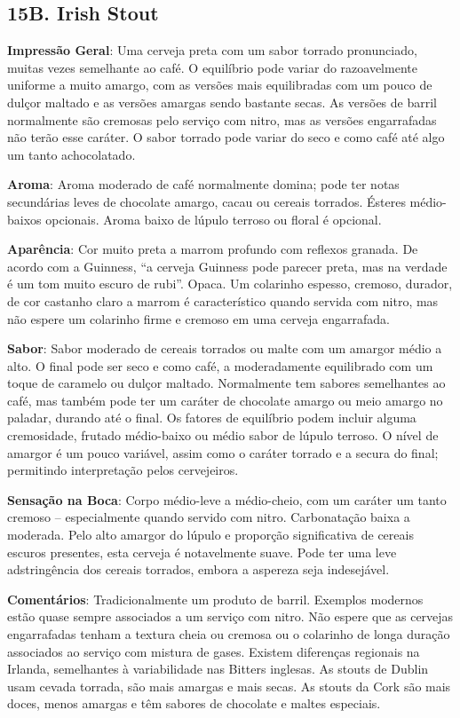 \subsection*{15B. Irish Stout}
\textbf{Impressão Geral}: Uma cerveja preta com um sabor torrado pronunciado, muitas vezes semelhante ao café. O equilíbrio pode variar do razoavelmente uniforme a muito amargo, com as versões mais equilibradas com um pouco de dulçor maltado e as versões amargas sendo bastante secas. As versões de barril normalmente são cremosas pelo serviço com nitro, mas as versões engarrafadas não terão esse caráter. O sabor torrado pode variar do seco e como café até algo um tanto achocolatado.

\textbf{Aroma}: Aroma moderado de café normalmente domina; pode ter notas secundárias leves de chocolate amargo, cacau ou cereais torrados. Ésteres médio-baixos opcionais. Aroma baixo de lúpulo terroso ou floral é opcional.

\textbf{Aparência}: Cor muito preta a marrom profundo com reflexos granada. De acordo com a Guinness, “a cerveja Guinness pode parecer preta, mas na verdade é um tom muito escuro de rubi”. Opaca. Um colarinho espesso, cremoso, durador, de cor castanho claro a marrom é característico quando servida com nitro, mas não espere um colarinho firme e cremoso em uma cerveja engarrafada.

\textbf{Sabor}: Sabor moderado de cereais torrados ou malte com um amargor médio a alto. O final pode ser seco e como café, a moderadamente equilibrado com um toque de caramelo ou dulçor maltado. Normalmente tem sabores semelhantes ao café, mas também pode ter um caráter de chocolate amargo ou meio amargo no paladar, durando até o final. Os fatores de equilíbrio podem incluir alguma cremosidade, frutado médio-baixo ou médio sabor de lúpulo terroso. O nível de amargor é um pouco variável, assim como o caráter torrado e a secura do final; permitindo interpretação pelos cervejeiros.

\textbf{Sensação na Boca}: Corpo médio-leve a médio-cheio, com um caráter um tanto cremoso – especialmente quando servido com nitro. Carbonatação baixa a moderada. Pelo alto amargor do lúpulo e proporção significativa de cereais escuros presentes, esta cerveja é notavelmente suave. Pode ter uma leve adstringência dos cereais torrados, embora a aspereza seja indesejável.

\textbf{Comentários}: Tradicionalmente um produto de barril. Exemplos modernos estão quase sempre associados a um serviço com nitro. Não espere que as cervejas engarrafadas tenham a textura cheia ou cremosa ou o colarinho de longa duração associados ao serviço com mistura de gases. Existem diferenças regionais na Irlanda, semelhantes à variabilidade nas Bitters inglesas. As stouts de Dublin usam cevada torrada, são mais amargas e mais secas. As stouts da Cork são mais doces, menos amargas e têm sabores de chocolate e maltes especiais.

